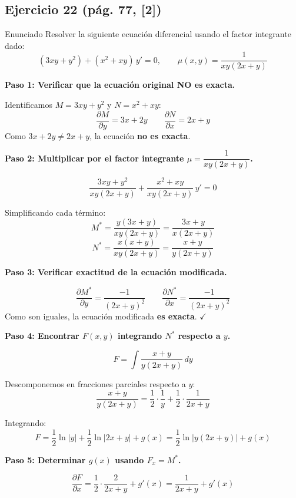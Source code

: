 \subsection*{Ejercicio 22 \quad\normalfont\small(pág. 77, [2])}
\begin{enunciado}{Enunciado}
    Resolver la siguiente ecuación diferencial usando el factor 
    integrante dado:
    \[
        (3xy + y^2) + (x^2 + xy)\,y' = 0, 
        \qquad \mu(x,y) = \frac{1}{xy(2x+y)}
    \]
\end{enunciado}

\begin{respuesta}

\textbf{Paso 1: Verificar que la ecuación original NO es exacta.}

Identificamos $M = 3xy + y^2$ y $N = x^2 + xy$:
\[
    \frac{\partial M}{\partial y} = 3x + 2y \qquad 
    \frac{\partial N}{\partial x} = 2x + y
\]
Como $3x + 2y \neq 2x + y$, la ecuación \textbf{no es exacta}.

\medskip
\textbf{Paso 2: Multiplicar por el factor integrante 
$\mu = \dfrac{1}{xy(2x+y)}$.}

\[
    \frac{3xy+y^2}{xy(2x+y)} + \frac{x^2+xy}{xy(2x+y)}\,y' = 0
\]

Simplificando cada término:
\[
    M^* = \frac{y(3x+y)}{xy(2x+y)} = \frac{3x+y}{x(2x+y)}
\]
\[
    N^* = \frac{x(x+y)}{xy(2x+y)} = \frac{x+y}{y(2x+y)}
\]

\medskip
\textbf{Paso 3: Verificar exactitud de la ecuación modificada.}

\[
    \frac{\partial M^*}{\partial y} = \frac{-1}{(2x+y)^2} \qquad
    \frac{\partial N^*}{\partial x} = \frac{-1}{(2x+y)^2}
\]
Como son iguales, la ecuación modificada \textbf{es exacta}. $\checkmark$

\medskip
\textbf{Paso 4: Encontrar $F(x,y)$ integrando $N^*$ respecto a $y$.}

\[
    F = \int \frac{x+y}{y(2x+y)}\,dy
\]

Descomponemos en fracciones parciales respecto a $y$:
\[
    \frac{x+y}{y(2x+y)} = \frac{1}{2} \cdot \frac{1}{y} 
    + \frac{1}{2} \cdot \frac{1}{2x+y}
\]

Integrando:
\[
    F = \frac{1}{2}\ln|y| + \frac{1}{2}\ln|2x+y| + g(x)
    = \frac{1}{2}\ln|y(2x+y)| + g(x)
\]

\medskip
\textbf{Paso 5: Determinar $g(x)$ usando $F_x = M^*$.}

\[
    \frac{\partial F}{\partial x} = \frac{1}{2} \cdot \frac{2}{2x+y} 
    + g'(x) = \frac{1}{2x+y} + g'(x)
\]


\end{respuesta}
